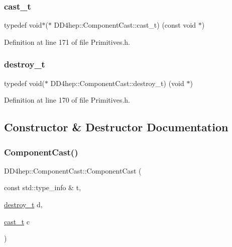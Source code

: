 \subsubsection{\texorpdfstring{cast\+\_\+t}{cast\_t}}
{\footnotesize\ttfamily typedef void$\ast$($\ast$ D\+D4hep\+::\+Component\+Cast\+::cast\+\_\+t) (const void $\ast$)}



Definition at line 171 of file Primitives.\+h.

\hypertarget{class_d_d4hep_1_1_component_cast_a846aa2764437b52901326d56a1092c59}{}\label{class_d_d4hep_1_1_component_cast_a846aa2764437b52901326d56a1092c59} 
\subsubsection{\texorpdfstring{destroy\+\_\+t}{destroy\_t}}
{\footnotesize\ttfamily typedef void($\ast$ D\+D4hep\+::\+Component\+Cast\+::destroy\+\_\+t) (void $\ast$)}



Definition at line 170 of file Primitives.\+h.



\subsection{Constructor \& Destructor Documentation}
\hypertarget{class_d_d4hep_1_1_component_cast_a6a1068534a7f7287cd1f4a342c34a91a}{}\label{class_d_d4hep_1_1_component_cast_a6a1068534a7f7287cd1f4a342c34a91a} 
\subsubsection{\texorpdfstring{Component\+Cast()}{ComponentCast()}}
{\footnotesize\ttfamily D\+D4hep\+::\+Component\+Cast\+::\+Component\+Cast (\begin{DoxyParamCaption}\item[{const std\+::type\+\_\+info \&}]{t,  }\item[{\hyperlink{class_d_d4hep_1_1_component_cast_a846aa2764437b52901326d56a1092c59}{destroy\+\_\+t}}]{d,  }\item[{\hyperlink{class_d_d4hep_1_1_component_cast_af22751cad5f2f61dbae30c26c91ac621}{cast\+\_\+t}}]{c }\end{DoxyParamCaption})\hspace{0.3cm}{\ttfamily [private]}}



